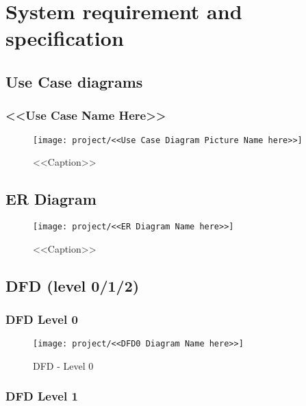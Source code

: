 \chapter{System requirement and specification}


\section{Use Case diagrams}
\subsection{<<Use Case Name Here>>}


\begin{figure}[H]
\centering
\texttt{[image: project/<<Use Case Diagram Picture Name here>>]}
\caption{<<Caption>>}
\label{<<Label>>}
\end{figure}



\section{ER Diagram}


\begin{figure}[H]
\centering
\texttt{[image: project/<<ER Diagram Name here>>]}
\caption{<<Caption>>}
\label{<<Label>>}
\end{figure}



\section{DFD (level 0/1/2)}

\subsection{DFD Level 0}

\begin{figure}[H]
\centering
\texttt{[image: project/<<DFD0 Diagram Name here>>]}
\caption{DFD - Level 0}
\label{fig:dfd0}
\end{figure}

\subsection{DFD Level 1}

